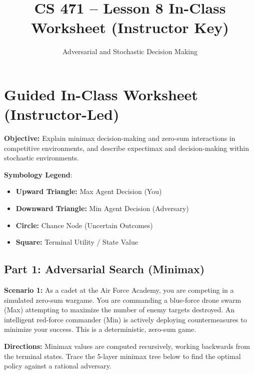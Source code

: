 \documentclass[11pt, letterpaper]{article}
\title{\textbf{CS 471 -- Lesson 8 In-Class Worksheet (Instructor Key)}}
\author{Adversarial and Stochastic Decision Making}
\date{}
\begin{document}
\maketitle

\section*{Guided In-Class Worksheet (Instructor-Led)}

\textbf{Objective:} Explain minimax decision-making and zero-sum interactions in competitive environments, and describe expectimax and decision-making within stochastic environments.

\vspace{0.5em}
\noindent\textbf{Symbology Legend}:
\begin{itemize}
    \item \textbf{Upward Triangle:} Max Agent Decision (You)
    \item \textbf{Downward Triangle:} Min Agent Decision (Adversary)
    \item \textbf{Circle:} Chance Node (Uncertain Outcomes)
    \item \textbf{Square:} Terminal Utility / State Value
\end{itemize}

\subsection*{Part 1: Adversarial Search (Minimax)}

\noindent\textbf{Scenario 1:} As a cadet at the Air Force Academy, you are competing in a simulated zero-sum wargame. You are commanding a blue-force drone swarm (Max) attempting to maximize the number of enemy targets destroyed. An intelligent red-force commander (Min) is actively deploying countermeasures to minimize your success. This is a deterministic, zero-sum game. 

\vspace{0.5em}
\noindent\textbf{Directions:} Minimax values are computed recursively, working backwards from the terminal states. Trace the 5-layer minimax tree below to find the optimal policy against a rational adversary.
\end{document}
